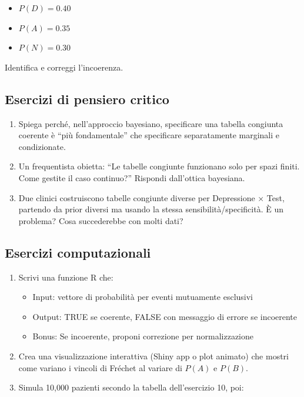 \documentclass[
  italian,
  letterpaper,
  a4paper,
  11pt,
  open=any]{scrbook}
\providecommand{\tightlist}{%
  \setlength{\itemsep}{0pt}\setlength{\parskip}{0pt}}
\theoremstyle{plain}
\theoremstyle{definition}
\theoremstyle{definition}
\theoremstyle{remark}
\begin{document}
\begin{tcolorbox}
\begin{enumerate}
  \begin{itemize}
  \tightlist
  \item
    \(P(D) = 0.40\)
  \item
    \(P(A) = 0.35\)
  \item
    \(P(N) = 0.30\)
  \end{itemize}

  Identifica e correggi l'incoerenza.
\end{enumerate}

\subsection{Esercizi di pensiero
critico}\label{esercizi-di-pensiero-critico}

\begin{enumerate}
\def\labelenumi{\arabic{enumi}.}
\setcounter{enumi}{12}
\item
  Spiega perché, nell'approccio bayesiano, specificare una tabella
  congiunta coerente è ``più fondamentale'' che specificare
  separatamente marginali e condizionate.
\item
  Un frequentista obietta: ``Le tabelle congiunte funzionano solo per
  spazi finiti. Come gestite il caso continuo?'' Rispondi dall'ottica
  bayesiana.
\item
  Due clinici costruiscono tabelle congiunte diverse per Depressione ×
  Test, partendo da prior diversi ma usando la stessa
  sensibilità/specificità. È un problema? Cosa succederebbe con molti
  dati?
\end{enumerate}

\subsection{Esercizi computazionali}\label{esercizi-computazionali}

\begin{enumerate}
\def\labelenumi{\arabic{enumi}.}
\setcounter{enumi}{15}
\item
  Scrivi una funzione R che:

  \begin{itemize}
  \tightlist
  \item
    Input: vettore di probabilità per eventi mutuamente esclusivi
  \item
    Output: TRUE se coerente, FALSE con messaggio di errore se
    incoerente
  \item
    Bonus: Se incoerente, proponi correzione per normalizzazione
  \end{itemize}
\item
  Crea una visualizzazione interattiva (Shiny app o plot animato) che
  mostri come variano i vincoli di Fréchet al variare di \(P(A)\) e
  \(P(B)\).
\item
  Simula 10,000 pazienti secondo la tabella dell'esercizio 10, poi:


\end{enumerate}
\end{tcolorbox}
\end{document}

